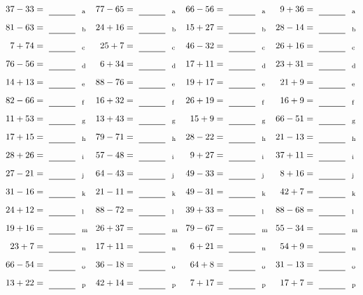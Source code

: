 \documentclass
[
  draft    = true,
  fontsize = 11pt,
  parskip  = half-
]
{scrartcl}
\begin{document}
\clearpage
\begin{align*}
    \pline{37-33}&=\rline{a}
  & \pline{77-65}&=\rline{a}
  & \pline{66-56}&=\rline{a}
  & \pline{9+36}&=\rline{a} \\[1ex]
    \pline{81-63}&=\rline{b}
  & \pline{24+16}&=\rline{b}
  & \pline{15+27}&=\rline{b}
  & \pline{28-14}&=\rline{b} \\[1ex]
    \pline{7+74}&=\rline{c}
  & \pline{25+7}&=\rline{c}
  & \pline{46-32}&=\rline{c}
  & \pline{26+16}&=\rline{c} \\[1ex]
    \pline{76-56}&=\rline{d}
  & \pline{6+34}&=\rline{d}
  & \pline{17+11}&=\rline{d}
  & \pline{23+31}&=\rline{d} \\[1ex]
    \pline{14+13}&=\rline{e}
  & \pline{88-76}&=\rline{e}
  & \pline{19+17}&=\rline{e}
  & \pline{21+9}&=\rline{e} \\[1ex]
    \pline{82-66}&=\rline{f}
  & \pline{16+32}&=\rline{f}
  & \pline{26+19}&=\rline{f}
  & \pline{16+9}&=\rline{f} \\[1ex]
    \pline{11+53}&=\rline{g}
  & \pline{13+43}&=\rline{g}
  & \pline{15+9}&=\rline{g}
  & \pline{66-51}&=\rline{g} \\[1ex]
    \pline{17+15}&=\rline{h}
  & \pline{79-71}&=\rline{h}
  & \pline{28-22}&=\rline{h}
  & \pline{21-13}&=\rline{h} \\[1ex]
    \pline{28+26}&=\rline{i}
  & \pline{57-48}&=\rline{i}
  & \pline{9+27}&=\rline{i}
  & \pline{37+11}&=\rline{i} \\[1ex]
    \pline{27-21}&=\rline{j}
  & \pline{64-43}&=\rline{j}
  & \pline{49-33}&=\rline{j}
  & \pline{8+16}&=\rline{j} \\[1ex]
    \pline{31-16}&=\rline{k}
  & \pline{21-11}&=\rline{k}
  & \pline{49-31}&=\rline{k}
  & \pline{42+7}&=\rline{k} \\[1ex]
    \pline{24+12}&=\rline{l}
  & \pline{88-72}&=\rline{l}
  & \pline{39+33}&=\rline{l}
  & \pline{88-68}&=\rline{l} \\[1ex]
    \pline{19+16}&=\rline{m}
  & \pline{26+37}&=\rline{m}
  & \pline{79-67}&=\rline{m}
  & \pline{55-34}&=\rline{m} \\[1ex]
    \pline{23+7}&=\rline{n}
  & \pline{17+11}&=\rline{n}
  & \pline{6+21}&=\rline{n}
  & \pline{54+9}&=\rline{n} \\[1ex]
    \pline{66-54}&=\rline{o}
  & \pline{36-18}&=\rline{o}
  & \pline{64+8}&=\rline{o}
  & \pline{31-13}&=\rline{o} \\[1ex]
    \pline{13+22}&=\rline{p}
  & \pline{42+14}&=\rline{p}
  & \pline{7+17}&=\rline{p}
  & \pline{17+7}&=\rline{p}
\end{align*}
\end{document}
